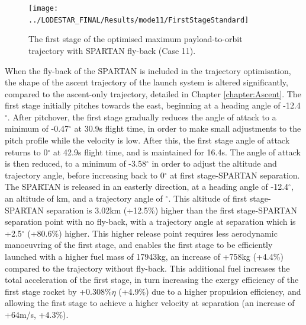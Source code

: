 \begin{figure}[ht]
	\centering
	\texttt{[image: ../LODESTAR\_FINAL/Results/mode11/FirstStageStandard]}
	\caption{The first stage of the optimised maximum payload-to-orbit trajectory with SPARTAN fly-back (Case 11). }
	\label{fig:FirstStageStandard}
\end{figure}
When the fly-back of the SPARTAN is included in the trajectory optimisation, the shape of the ascent trajectory of the launch system is altered significantly, compared to the ascent-only trajectory, detailed in Chapter \ref{chapter:Ascent}.
 The first stage initially pitches towards the east, beginning at a heading angle of -12.4$^\circ$.
 After pitchover, the first stage gradually reduces the angle of attack to a minimum of -0.47$^\circ$ at 30.9s flight time, in order to make small adjustments to the pitch profile while the velocity is low. After this, the first stage angle of attack returns to 0$^\circ$ at 42.9s flight time, and is maintained for 16.4s.
 The angle of attack is then reduced, to a minimum of -3.58$^\circ$ in order to adjust the altitude and trajectory angle, before increasing back to 0$^\circ$ at first stage-SPARTAN separation. 
 The SPARTAN is released in an easterly direction, at a heading angle of -12.4$^\circ$, an altitude of \firstsecondSeparationAltStandard km, and a trajectory angle of \firstsecondSeparationgammaStandard $^\circ$. 
 This altitude of first stage-SPARTAN separation is 3.02km (+12.5\%) higher than the first stage-SPARTAN separation point with no fly-back, with a trajectory angle at separation which is +2.5$^\circ$ (+80.6\%) higher. 
 This higher release point requires less aerodynamic manoeuvring of the first stage, and enables the first stage to be efficiently launched with a higher fuel mass of 17943kg, an increase of +758kg (+4.4\%) compared to the trajectory without fly-back. This additional fuel increases the total acceleration of the first stage,
 in turn increasing the exergy efficiency of the first stage rocket by +0.308\%$\eta$ (+4.9\%) due to a higher propulsion efficiency, and allowing the first stage to achieve a higher velocity at separation (an increase of +64m/s, +4.3\%). 
 
